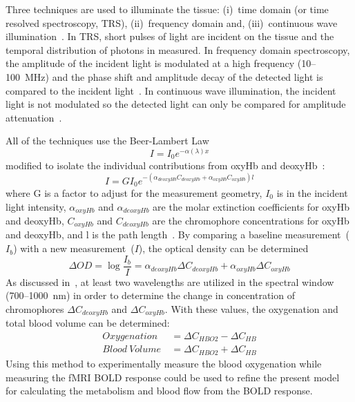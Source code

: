 Three techniques are used to illuminate the tissue: (i)~time domain (or time resolved spectroscopy, TRS), (ii)~frequency domain and, (iii)~continuous wave illumination~\citep{izzetoglu2004}.  In TRS, short pulses of light are incident on the tissue and the temporal distribution of photons in measured.  In frequency domain spectroscopy, the amplitude of the incident light is modulated at a high frequency (10--100~MHz) and the phase shift and amplitude decay of the detected light is compared to the incident light~\citep{boas2002}. In continuous wave illumination, the incident light is not modulated so the detected light can only be compared for amplitude attenuation~\citep{izzetoglu2004}.

All of the techniques use the Beer-Lambert Law~\citep{beerlambert}
\begin{equation}
  I = I_0 e^{-\alpha (\lambda) x} \label{eq:beerlambert1}
\end{equation} 
modified to isolate the individual contributions from oxyHb and deoxyHb~\citep{cope}:
\begin{equation}
  \label{eq:modifiedbeerlamber}
  I = G I_0 e^{-(\alpha_{deoxyHb}C_{deoxyHb}+\alpha_{oxyHb}C_{oxyHb}) l} 
\end{equation}
where G is a factor to adjust for the measurement geometry, $I_0$ is in the incident light intensity, $\alpha_{oxyHb}$ and $\alpha_{deoxyHb}$ are the molar extinction coefficients for oxyHb and deoxyHb, $C_{oxyHb}$ and $C_{deoxyHb}$ are the chromophore concentrations for oxyHb and deoxyHb, and l is the path length~\citep{izzetoglu2004}.  By comparing a baseline measurement~($I_b$) with a new measurement~($I$), the optical density can be determined~\citep{izzetoglu2004}
\begin{equation}
  \Delta OD = \log \frac{I_b}{I} = \alpha_{deoxyHb} \Delta C_{deoxyHb}+\alpha_{oxyHb} \Delta C_{oxyHb}
\end{equation}
As discussed in~\citet{izzetoglu2004}, at least two wavelengths are utilized in the spectral window (700--1000~nm) in order to determine the change in concentration of chromophores $\Delta C_{deoxyHb}$ and $\Delta C_{oxyHb}$.  With these values, the oxygenation and total blood volume can be determined:
\begin{align}
  \label{eq:o2bloodvolume}
  Oxygenation\ &= \Delta C_{HBO2} - \Delta C_{HB} \nonumber \\
  Blood\ Volume\ &= \Delta C_{HBO2} + \Delta C_{HB} 
\end{align}
Using this method to experimentally measure the blood oxygenation while measuring the fMRI BOLD response could be used to refine the present model for calculating the metabolism and blood flow from the BOLD response.

